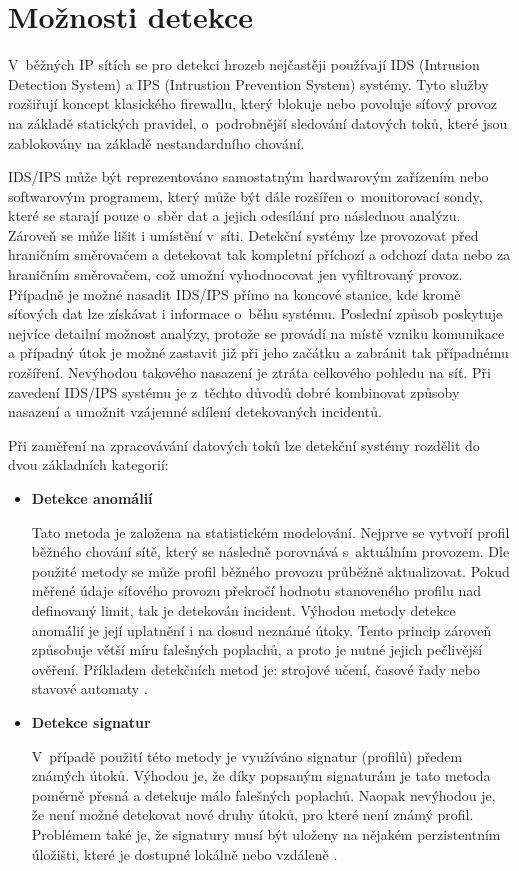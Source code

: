  \newpage
 \section{Možnosti detekce}
 V~běžných IP sítích se pro detekci hrozeb nejčastěji používají IDS (Intrusion Detection System) a
 IPS (Intrustion Prevention System) systémy. Tyto služby rozšiřují koncept klasického firewallu, který
 blokuje nebo povoluje síťový provoz na základě statických pravidel, o~podrobnější sledování 
 datových toků, které jsou zablokovány na základě nestandardního chování.
 
 IDS/IPS může být reprezentováno samostatným hardwarovým zařízením nebo softwarovým programem, který
 může být dále rozšířen o~monitorovací sondy, které se starají pouze o~sběr dat a jejich odesílání
 pro následnou analýzu. Zároveň
 se může lišit i umístění v~síti. Detekční systémy lze provozovat před hraničním směrovačem 
 a detekovat tak kompletní příchozí a odchozí data nebo za hraničním směrovačem, což 
 umožní vyhodnocovat jen vyfiltrovaný provoz. Případně je možné nasadit IDS/IPS přímo na koncové
 stanice, kde kromě síťových dat lze získávat i informace o~běhu systému. Poslední způsob poskytuje
 nejvíce detailní možnost analýzy, protože se provádí na místě vzniku komunikace a případný útok
 je možné zastavit již při jeho začátku a zabránit tak případnému rozšíření. Nevýhodou takového nasazení
 je ztráta celkového pohledu na síť. Při zavedení IDS/IPS systému je z~těchto důvodů dobré 
 kombinovat způsoby nasazení a umožnit vzájemné sdílení detekovaných incidentů.
 
 Při zaměření na zpracovávání datových toků lze detekční systémy rozdělit do dvou základních kategorií:
 \begin{itemize}
  \item \textbf{Detekce anomálií}
  
  Tato metoda je založena na statistickém modelování. Nejprve se vytvoří profil běžného chování sítě, 
  který se následně porovnává s~aktuálním provozem. Dle použité metody se může profil běžného provozu
  průběžně aktualizovat. Pokud měřené údaje síťového provozu překročí hodnotu stanoveného profilu
  nad definovaný limit, tak je detekován incident. Výhodou metody detekce anomálií je její uplatnění i na 
  dosud neznámé útoky. Tento princip zároveň způsobuje větší míru falešných poplachů, a proto 
  je nutné jejich pečlivější ověření. Příkladem detekčních metod je: strojové učení, časové řady nebo
  stavové automaty \cite{ids-ips}.
  
  \item \textbf{Detekce signatur}
  
  V~případě použití této metody je využíváno signatur (profilů) předem známých útoků. Výhodou je, že díky 
  popsaným signaturám je tato metoda poměrně přesná a detekuje málo falešných poplachů. Naopak
  nevýhodou je, že není možné detekovat nové druhy útoků, pro které není známý profil. Problémem
  také je, že signatury musí být uloženy na nějakém perzistentním úložišti, které je dostupné 
  lokálně nebo vzdáleně \cite{ids-ips}.
 \end{itemize}
 
